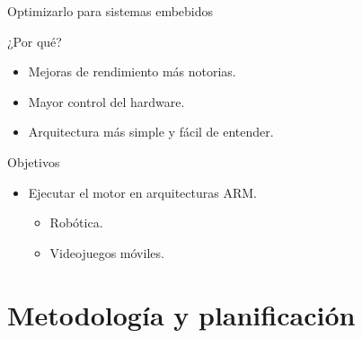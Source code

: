 \documentclass[10pt,xcolor=table]{beamer}
\begin{document}
\begin{frame}{Optimizarlo para sistemas embebidos}

  \begin{block}{¿Por qué?}
  \begin{itemize}
    \item Mejoras de rendimiento más notorias.
    \item Mayor control del hardware.
    \item Arquitectura más simple y fácil de entender.
    \end{itemize}
  \end{block}

  \begin{block}{Objetivos}
  \begin{itemize}
    \item Ejecutar el motor en arquitecturas ARM.
    \begin{itemize}
      \item Robótica.
      \item Videojuegos móviles.
    \end{itemize}
  \end{itemize}
  \end{block}
\end{frame}

\section{Metodología y planificación}
\end{document}
